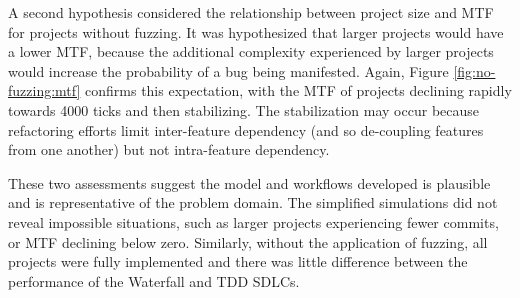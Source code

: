 \documentclass{llncs}
\begin{document}
A second hypothesis considered the relationship between project size and MTF for projects without fuzzing. It was
hypothesized that larger projects would have a lower MTF, because the additional complexity experienced by larger
projects would increase the probability of a bug being manifested.  Again, Figure \ref{fig:no-fuzzing:mtf} confirms this
expectation, with the MTF of projects declining rapidly towards 4000 ticks and then stabilizing.  The stabilization may
occur because refactoring efforts limit inter-feature dependency (and so de-coupling features from one another) but not
intra-feature dependency.

These two assessments suggest the model and workflows developed is plausible and is representative of the problem
domain.  The simplified simulations did not reveal impossible situations, such as larger projects experiencing fewer
commits, or MTF declining below zero.  Similarly, without the application of fuzzing, all projects were fully
implemented and there was little difference between the performance of the Waterfall and TDD SDLCs.
\end{document}
